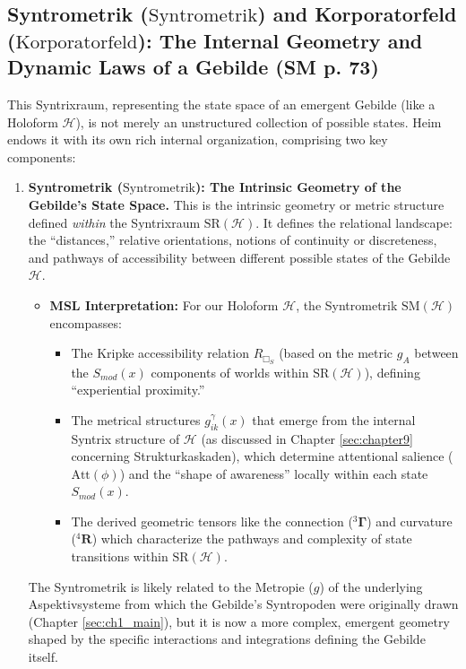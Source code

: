 \documentclass[
    12pt,              %
    a4paper,           %
    headings=normal,   %
    twoside=true,      %
    BCOR=8mm,          %
]{scrbook}
\newcommand{\q}[1]{\enquote{#1}}
\newcommand{\syntrometrik}{\text{Syntrometrik}}
\newcommand{\korporatorfeld}{\text{Korporatorfeld}}
\newcommand{\BoxS}{\Box_S}
\begin{document}
\subsection{Syntrometrik (\(\syntrometrik\)) and Korporatorfeld (\(\korporatorfeld\)): The Internal Geometry and Dynamic Laws of a Gebilde (SM p. 73)}
\label{sec:ch4_syntrometrik_korporatorfeld_revised_2} 

This Syntrixraum, representing the state space of an emergent Gebilde (like a Holoform \(\mathcal{H}\)), is not merely an unstructured collection of possible states. Heim endows it with its own rich internal organization, comprising two key components:

\begin{enumerate}[label=(\alph*)]
    \item  \textbf{Syntrometrik (\(\syntrometrik\)): The Intrinsic Geometry of the Gebilde's State Space.}
        This is the intrinsic geometry or metric structure defined \textit{within} the Syntrixraum \(\text{SR}(\mathcal{H})\). It defines the relational landscape: the \q{distances,} relative orientations, notions of continuity or discreteness, and pathways of accessibility between different possible states of the Gebilde \(\mathcal{H}\).
        \begin{itemize}
            \item   \textbf{MSL Interpretation:} For our Holoform \(\mathcal{H}\), the Syntrometrik \(\text{SM}(\mathcal{H})\) encompasses:
                \begin{itemize}
                    \item   The Kripke accessibility relation \(R_{\BoxS}\) (based on the metric \(g_A\) between the \(S_{mod}(x)\) components of worlds within \(\text{SR}(\mathcal{H})\)), defining \q{experiential proximity.}
                    \item   The metrical structures \(g_{ik}^\gamma(x)\) that emerge from the internal Syntrix structure of \(\mathcal{H}\) (as discussed in Chapter \ref{sec:chapter9} concerning Strukturkaskaden), which determine attentional salience (\(\text{Att}(\phi)\)) and the \q{shape of awareness} locally within each state \(S_{mod}(x)\).
                    \item   The derived geometric tensors like the connection (\({}^3\bm{\Gamma}\)) and curvature (\({}^4\mathbf{R}\)) which characterize the pathways and complexity of state transitions within \(\text{SR}(\mathcal{H})\).
                \end{itemize}
        \end{itemize}
        The Syntrometrik is likely related to the Metropie (\(g\)) of the underlying Aspektivsysteme from which the Gebilde's Syntropoden were originally drawn (Chapter \ref{sec:ch1_main}), but it is now a more complex, emergent geometry shaped by the specific interactions and integrations defining the Gebilde itself.


\end{enumerate}
\end{document}
